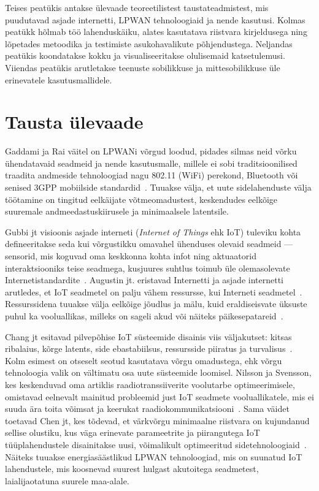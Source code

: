 \documentclass[12pt]{article}
\begin{document}
Teises peatükis antakse ülevaade teoreetilistest taustateadmistest, mis puudutavad asjade internetti, LPWAN tehnoloogiaid ja nende kasutusi.
Kolmas peatükk hõlmab töö lahenduskäiku, alates kasutatava riistvara kirjeldusega ning lõpetades metoodika ja testimiste asukohavalikute põhjendustega.
Neljandas peatükis koondatakse kokku ja visualiseeritakse olulisemaid katsetulemusi.
Viiendas peatükis arutletakse teenuste sobilikkuse ja mittesobilikkuse üle erinevatele kasutusmallidele.

\newpage
\section{Tausta ülevaade}

Gaddami ja Rai väitel on LPWANi võrgud loodud, pidades silmas neid võrku ühendatavaid seadmeid ja nende kasutusmalle, millele ei sobi traditsioonilised traadita andmeside tehnoloogiad nagu 802.11 (WiFi) perekond, Bluetooth või senised 3GPP mobiilside standardid~\cite{gaddam2018comparative}.
Tuuakse välja, et uute sidelahenduste välja töötamine on tingitud eelkäijate võtmeomadustest, keskendudes eelkõige  suuremale andmeedastuskiirusele ja minimaalsele latentsile.

Gubbi jt visioonis asjade interneti (\textit{Internet of Things} ehk IoT) tuleviku kohta defineeritakse seda kui võrgustikku omavahel ühenduses olevaid seadmeid — sensorid, mis koguvad oma keskkonna kohta infot ning aktuaatorid interaktsiooniks teise seadmega, kusjuures suhtlus toimub üle olemasolevate Internetistandardite~\cite{gubbi2013internet}.
Augustin jt. eristavad Internetti ja asjade internetti arutledes, et IoT seadmetel on palju vähem ressursse, kui Interneti seadmetel~\cite{augustin2016study}.
Ressurssidena tuuakse välja eelkõige jõudlus ja mälu, kuid eraldiseisvate üksuste puhul ka vooluallikas, milleks on sageli akud või näiteks päikesepatareid~\cite{mabon2019smaller}.

Chang jt esitavad pilvepõhise IoT süsteemide disainis viis väljakutset: kitsas ribalaius, kõrge latents, side ebastabiilsus, ressursside piiratus ja turvalisus~\cite{chang2019internet}.
Kolm esimest on otseselt seotud kasutatava võrgu omadustega, ehk võrgu tehnoloogia valik on vältimatu osa uute süsteemide loomisel.
Nilsson ja Svensson, kes keskenduvad oma artiklis raadiotranssiiverite voolutarbe optimeerimisele, omistavad eelnevalt mainitud probleemid just IoT seadmete vooluallikatele, mis ei suuda ära toita võimsat ja keerukat raadiokommunikatsiooni~\cite{nilsson2014power}.
Sama väidet toetavad Chen jt, kes tõdevad, et värkvõrgu minimaalne riistvara on kujundanud sellise olustiku, kus väga erinevate parameetrite ja piirangutega IoT tüüplahendustele disainitakse uusi, võimalikult optimeeritud sidetehnoloogiaid~\cite{chen2018cognitive}.
Näiteks tuuakse energiasäästlikud LPWAN tehnoloogiad, mis on suunatud IoT lahendustele, mis koosnevad suurest hulgast akutoitega seadmetest, laialijaotatuna suurele maa-alale.
\end{document}
